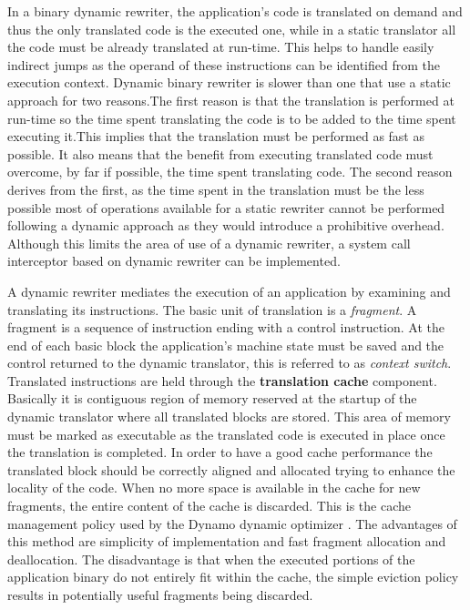 In a binary dynamic rewriter, the application’s code is translated on demand and thus the only translated code is the executed one, while in a static translator all the code must be already translated at run-time. This helps to handle easily indirect jumps as the operand of these instructions can be identified from the execution context. Dynamic binary rewriter is slower than one that use a static approach for two reasons.The first reason is that the translation is performed at run-time so the time spent translating the code is to be added to  the time spent executing it.This implies that the translation must be performed as fast as possible. It also means that the benefit from executing translated code must overcome, by far if possible, the time spent translating code. The second reason derives from the first, as the time spent in the translation must be the less possible most of operations available for a static rewriter cannot be performed following a dynamic approach as they would introduce a prohibitive overhead.  Although this limits the area of use of a dynamic rewriter, a system call interceptor based on dynamic rewriter can be implemented. 

A dynamic rewriter mediates the execution of an application by examining and translating its instructions. The basic unit of translation is a \emph{fragment}. A fragment is a sequence of instruction ending with a control instruction.  At the end of each basic block the application’s machine state must be saved and the control returned to the dynamic translator, this is referred to as \emph{context switch}. Translated instructions are held through the \textbf{translation cache} component. Basically it is contiguous region of memory reserved at the startup of the dynamic translator where all translated blocks are stored. This area of memory must be marked as executable as the translated code is executed in place once the translation is completed.  In order to have a good cache performance the translated block should be correctly aligned and allocated trying to enhance the locality of the code. When no more space is available in the cache for new fragments, the entire content of the cache is discarded. This is the cache management policy used by the Dynamo dynamic optimizer \cite{DynamoRio}. The advantages of this method are simplicity of implementation and fast fragment allocation and deallocation. The disadvantage is that when the executed portions of the application binary do not entirely fit within the cache, the simple eviction policy results in potentially useful fragments being discarded. 

